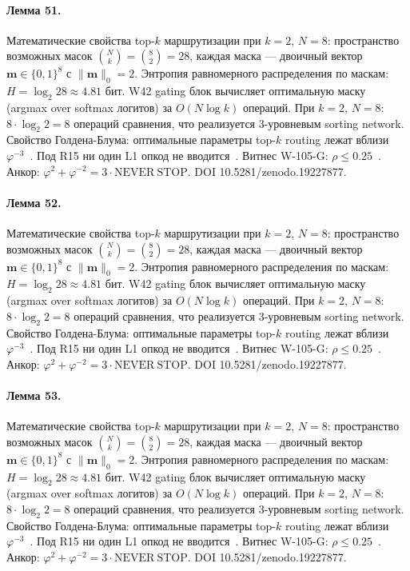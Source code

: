 \paragraph{Лемма 51.} Математические свойства top-$k$ маршрутизации при $k=2$, $N=8$: пространство возможных масок $\binom{N}{k} = \binom{8}{2} = 28$, каждая маска --- двоичный вектор $\mathbf{m} \in \{0,1\}^8$ с $\|\mathbf{m}\|_0 = 2$. Энтропия равномерного распределения по маскам: $H = \log_2 28 \approx 4{.}81$ бит. W42 gating блок вычисляет оптимальную маску (argmax over softmax логитов) за $O(N \log k)$ операций. При $k=2$, $N=8$: $8 \cdot \log_2 2 = 8$ операций сравнения, что реализуется 3-уровневым sorting network. Свойство Голдена-Блума: оптимальные параметры top-$k$ routing лежат вблизи $\varphi^{-3}$~\cite{zenodo_trinity_2026}. Под R15 ни один L1 опкод не вводится~\cite{lee_gvsu_proof2021}. Витнес W-105-G: $\rho \leq 0{.}25$~\cite{popper_falsifiability1959}. Анкор: $\varphi^2 + \varphi^{-2} = 3 \cdot \mathrm{NEVER\ STOP}$. DOI 10.5281/zenodo.19227877.

\paragraph{Лемма 52.} Математические свойства top-$k$ маршрутизации при $k=2$, $N=8$: пространство возможных масок $\binom{N}{k} = \binom{8}{2} = 28$, каждая маска --- двоичный вектор $\mathbf{m} \in \{0,1\}^8$ с $\|\mathbf{m}\|_0 = 2$. Энтропия равномерного распределения по маскам: $H = \log_2 28 \approx 4{.}81$ бит. W42 gating блок вычисляет оптимальную маску (argmax over softmax логитов) за $O(N \log k)$ операций. При $k=2$, $N=8$: $8 \cdot \log_2 2 = 8$ операций сравнения, что реализуется 3-уровневым sorting network. Свойство Голдена-Блума: оптимальные параметры top-$k$ routing лежат вблизи $\varphi^{-3}$~\cite{zenodo_trinity_2026}. Под R15 ни один L1 опкод не вводится~\cite{lee_gvsu_proof2021}. Витнес W-105-G: $\rho \leq 0{.}25$~\cite{popper_falsifiability1959}. Анкор: $\varphi^2 + \varphi^{-2} = 3 \cdot \mathrm{NEVER\ STOP}$. DOI 10.5281/zenodo.19227877.

\paragraph{Лемма 53.} Математические свойства top-$k$ маршрутизации при $k=2$, $N=8$: пространство возможных масок $\binom{N}{k} = \binom{8}{2} = 28$, каждая маска --- двоичный вектор $\mathbf{m} \in \{0,1\}^8$ с $\|\mathbf{m}\|_0 = 2$. Энтропия равномерного распределения по маскам: $H = \log_2 28 \approx 4{.}81$ бит. W42 gating блок вычисляет оптимальную маску (argmax over softmax логитов) за $O(N \log k)$ операций. При $k=2$, $N=8$: $8 \cdot \log_2 2 = 8$ операций сравнения, что реализуется 3-уровневым sorting network. Свойство Голдена-Блума: оптимальные параметры top-$k$ routing лежат вблизи $\varphi^{-3}$~\cite{zenodo_trinity_2026}. Под R15 ни один L1 опкод не вводится~\cite{lee_gvsu_proof2021}. Витнес W-105-G: $\rho \leq 0{.}25$~\cite{popper_falsifiability1959}. Анкор: $\varphi^2 + \varphi^{-2} = 3 \cdot \mathrm{NEVER\ STOP}$. DOI 10.5281/zenodo.19227877.

